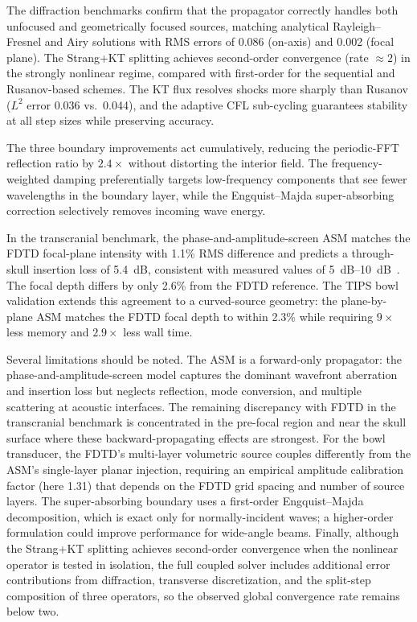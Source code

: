 \documentclass[11pt]{article}
\begin{document}
The diffraction benchmarks confirm that the propagator correctly
handles both unfocused and geometrically focused sources, matching
analytical Rayleigh--Fresnel and Airy solutions with RMS errors of
0.086 (on-axis) and 0.002 (focal plane).  The Strang+KT splitting
achieves second-order convergence (rate $\approx 2$) in the strongly
nonlinear regime, compared with first-order for the sequential and
Rusanov-based schemes.  The KT flux resolves shocks more sharply than
Rusanov ($L^2$ error 0.036 vs.\ 0.044), and the adaptive CFL
sub-cycling guarantees stability at all step sizes while preserving
accuracy.

The three boundary improvements act cumulatively, reducing the
periodic-FFT reflection ratio by $2.4\times$ without distorting the
interior field.  The frequency-weighted damping preferentially targets
low-frequency components that see fewer wavelengths in the boundary
layer, while the Engquist--Majda super-absorbing correction selectively
removes incoming wave energy.

In the transcranial benchmark, the phase-and-amplitude-screen ASM
matches the FDTD focal-plane intensity with 1.1\% RMS difference and
predicts a through-skull insertion loss of \SI{5.4}{\deci\bel},
consistent with measured values of
\SIrange{5}{10}{\deci\bel}~\cite{pinton2012}.  The focal depth
differs by only 2.6\% from the FDTD reference.  The TIPS bowl
validation extends this agreement to a curved-source geometry: the
plane-by-plane ASM matches the FDTD focal depth to within 2.3\% while
requiring $9\times$ less memory and $2.9\times$ less wall time.

Several limitations should be noted.  The ASM is a forward-only
propagator: the phase-and-amplitude-screen model captures the dominant
wavefront aberration and insertion loss but neglects reflection, mode
conversion, and multiple scattering at acoustic interfaces.  The
remaining discrepancy with FDTD in the transcranial benchmark is
concentrated in the pre-focal region and near the skull surface where
these backward-propagating effects are strongest.  For the bowl
transducer, the FDTD's multi-layer volumetric source couples
differently from the ASM's single-layer planar injection, requiring an
empirical amplitude calibration factor (here 1.31) that depends on the
FDTD grid spacing and number of source layers.  The super-absorbing
boundary uses a first-order Engquist--Majda decomposition, which is
exact only for normally-incident waves; a higher-order formulation
\cite{higdon1986} could improve performance for wide-angle beams.
Finally, although the Strang+KT splitting achieves second-order
convergence when the nonlinear operator is tested in isolation, the
full coupled solver includes additional error contributions from
diffraction, transverse discretization, and the split-step composition
of three operators, so the observed global convergence rate remains
below two.
\end{document}
